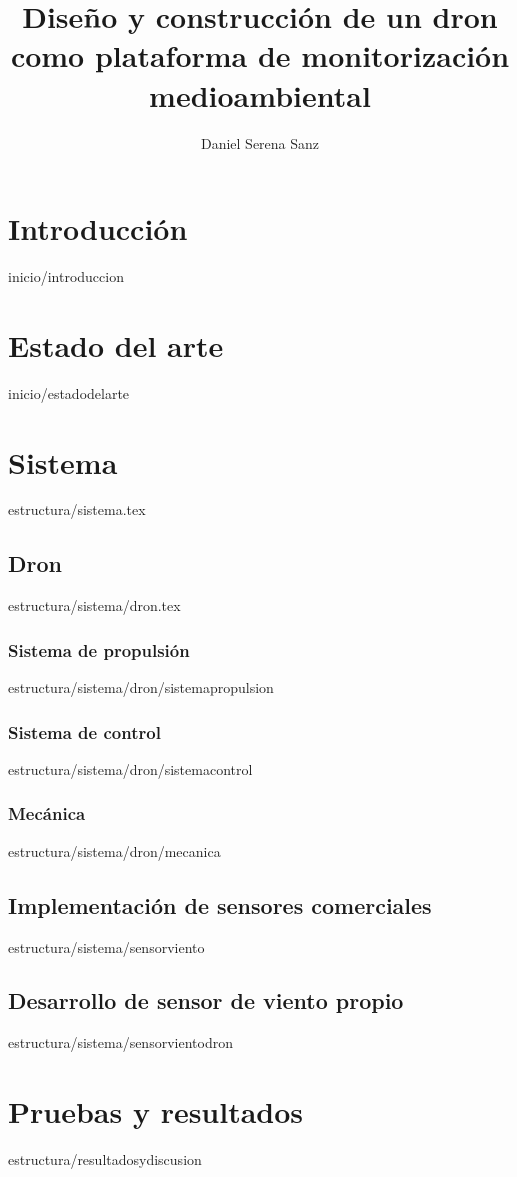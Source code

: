 \documentclass[epsbased,lof,loe,loc,copyright,final,printable,extendedindex,firstnumbered,tfg,gnuplot]{tfgtfmthesisuam}
\title{Diseño y construcción de un dron como plataforma de monitorización medioambiental}
\author{Daniel Serena Sanz}
\begin{document}
\chapter{Introducción\label{CAP:INTRODUCCION}}{inicio/introduccion}
\chapter{Estado del arte\label{CAP:ESTADODELARTE}}{inicio/estadodelarte}
\chapter{Sistema\label{CAP:SISTEMA}}{estructura/sistema.tex}

	\section{Dron\label{SEC:DRON}}{estructura/sistema/dron.tex}
		\subsection{Sistema de propulsión\label{SS:SISTPROPULSION}}{estructura/sistema/dron/sistemapropulsion}
		\subsection{Sistema de control\label{SS:SISTCONTROL}}{estructura/sistema/dron/sistemacontrol}
		\subsection{Mecánica\label{SS:MECANICA}}{estructura/sistema/dron/mecanica}
		
	\section{Implementación de sensores comerciales\label{SEC:SENSORVIENTO}}{estructura/sistema/sensorviento}
	
	\section{Desarrollo de sensor de viento propio\label{SEC:SENSORVIENTODRON}}{estructura/sistema/sensorvientodron}

\chapter{Pruebas y resultados\label{CAP:RESEXPYDISC}}{estructura/resultadosydiscusion}
\end{document}
